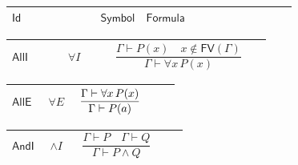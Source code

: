 \documentclass[12pt,reqno]{amsart}
\theoremstyle{blueplain}
\numberwithin{equation}{section}
\newlength{\FTCOneColumnBody}
\begin{document}
{\scriptsize {\ }}

{\scriptsize \setlength{\parskip}{0pt}\nointerlineskip
\noindent 
\begin{tabular}{|@{}>{\centering\arraybackslash}m{\FTCOneColumnBody}|}
\hline
$\displaystyle \mathsf{Logic}$ \\ \hline
\end{tabular}%
}

{\scriptsize \setlength{\parskip}{0pt}\nointerlineskip
\noindent 
\begin{tabular}{|@{}>{\centering\arraybackslash}m{0.19251\linewidth}|>{\centering\arraybackslash}m{0.16845\linewidth}|>{\centering\arraybackslash}m{0.53904\linewidth}|}
\hline
$\displaystyle \mathsf{Id}$ & $\displaystyle \mathsf{Symbol}$ & $%
\displaystyle \mathsf{Formula}$ \\ \hline
\end{tabular}%
}

{\scriptsize \setlength{\parskip}{0pt}\nointerlineskip
\noindent 
\begin{tabular}{|@{}>{\centering\arraybackslash}m{0.19251\linewidth}|>{\centering\arraybackslash}m{0.16845\linewidth}|>{\centering\arraybackslash}m{0.53904\linewidth}|}
\hline
\hypertarget{rule:AllI}{$\displaystyle \mathsf{AllI}$} & $\displaystyle %
\forall I$ & \rule[-3.3ex]{0pt}{7.8ex}$\displaystyle \dfrac{\Gamma\vdash
P(x)\quad x\notin\mathsf{FV}(\Gamma)}{\Gamma\vdash\forall x\,P(x)}$ \\ \hline
\end{tabular}%
}

{\scriptsize \setlength{\parskip}{0pt}\nointerlineskip
\noindent 
\begin{tabular}{|@{}>{\centering\arraybackslash}m{0.19251\linewidth}|>{\centering\arraybackslash}m{0.16845\linewidth}|>{\centering\arraybackslash}m{0.53904\linewidth}|}
\hline
\hypertarget{rule:AllE}{$\displaystyle \mathsf{AllE}$} & $\displaystyle %
\forall E$ & \rule[-3.3ex]{0pt}{7.8ex}$\displaystyle \dfrac{%
\Gamma\vdash\forall x\,P(x)}{\Gamma\vdash P(a)}$ \\ \hline
\end{tabular}%
}

{\scriptsize \setlength{\parskip}{0pt}\nointerlineskip
\noindent 
\begin{tabular}{|@{}>{\centering\arraybackslash}m{0.19251\linewidth}|>{\centering\arraybackslash}m{0.16845\linewidth}|>{\centering\arraybackslash}m{0.53904\linewidth}|}
\hline
\hypertarget{rule:AndI}{$\displaystyle \mathsf{AndI}$} & $\displaystyle %
\wedge I$ & \rule[-3.3ex]{0pt}{7.8ex}$\displaystyle \dfrac{\Gamma\vdash
P\quad\Gamma\vdash Q}{\Gamma\vdash P\land Q}$ \\ \hline
\end{tabular}%
}
\end{document}
